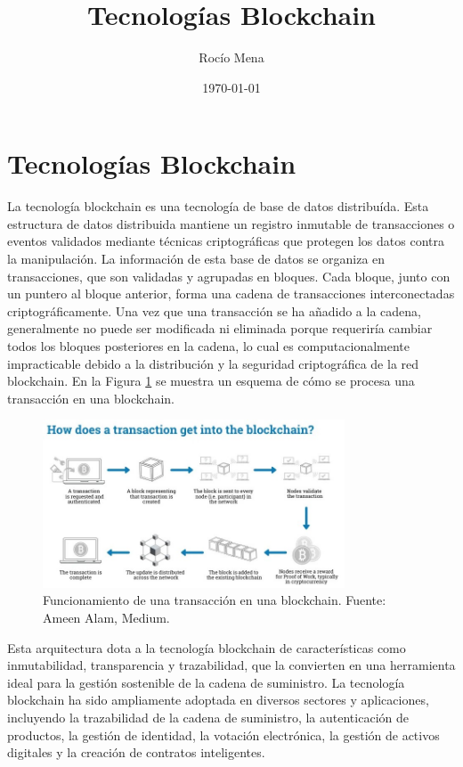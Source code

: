 \documentclass[main.tex]{subfiles}
\title{Tecnologías Blockchain}
\author{Rocío Mena}
\date{\today}
\begin{document}
\maketitle

\section{Tecnologías Blockchain}

La tecnología blockchain es una tecnología de base de datos distribuída. Esta estructura de datos distribuida mantiene un registro inmutable de transacciones o eventos validados mediante técnicas criptográficas que protegen los datos contra la manipulación. La información de esta base de datos se organiza en transacciones, que son validadas y agrupadas en bloques. Cada bloque, junto con un puntero al bloque anterior, forma una cadena de transacciones interconectadas criptográficamente. Una vez que una transacción se ha añadido a la cadena, generalmente no puede ser modificada ni eliminada porque requeriría cambiar todos los bloques posteriores en la cadena, lo cual es computacionalmente impracticable debido a la distribución y la seguridad criptográfica de la red blockchain. En la Figura \ref{fig:blockchain} se muestra un esquema de cómo se procesa una transacción en una blockchain.

\begin{figure}[h]
	\centering
	\includegraphics[width=0.8\textwidth]{./assets/blockchain.jpg}
	\caption{Funcionamiento de una transacción en una blockchain. Fuente: Ameen Alam, Medium.}
	\label{fig:blockchain}
\end{figure}

Esta arquitectura dota a la tecnología blockchain de características como inmutabilidad, transparencia y trazabilidad, que la convierten en una herramienta ideal para la gestión sostenible de la cadena de suministro. La tecnología blockchain ha sido ampliamente adoptada en diversos sectores y aplicaciones, incluyendo la trazabilidad de la cadena de suministro, la autenticación de productos, la gestión de identidad, la votación electrónica, la gestión de activos digitales y la creación de contratos inteligentes.
\end{document}

